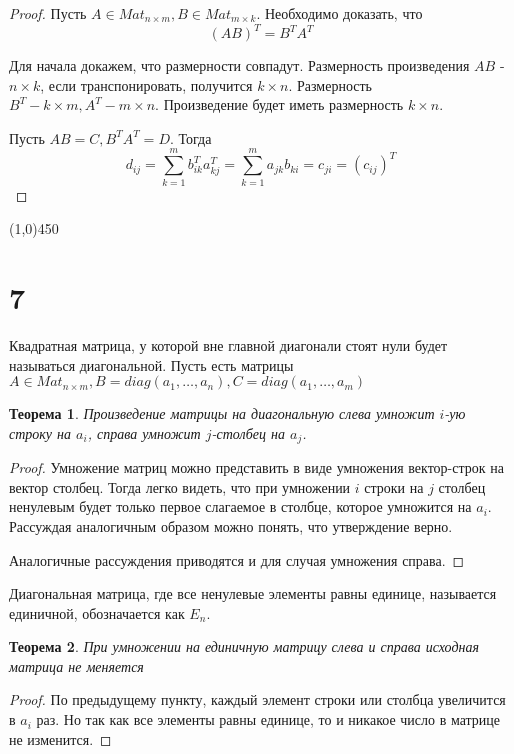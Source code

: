 \documentclass[a4paper,12pt]{article}
\newtheorem*{ther}{Теорема}
\begin{document}
	\begin{proof}
		Пусть $A \in Mat_{n \times m}, B \in Mat_{m \times k}$. Необходимо доказать, что 
		\[
		(AB)^T = B^TA^T
		\]
		
		Для начала докажем, что размерности совпадут. Размерность произведения $AB$ - $n \times k$, если транспонировать, получится $k \times n$. Размерность $B^T - k \times m, A^T - m \times n$. Произведение будет иметь размерность $k \times n$.	
		
		Пусть $AB = C, B^TA^T = D$. Тогда
		\[
		d_{ij} = \sum_{k = 1}^{m} b_{ik}^Ta_{kj}^T = \sum_{k = 1}^{m} a_{jk}b_{ki} = c_{ji} = (c_{ij})^T
		\]
	\end{proof}

	\begin{center}
		\line(1,0){450}
	\end{center}
	
	
	
	\section*{7}
	
	Квадратная матрица, у которой вне главной диагонали стоят нули будет называться диагональной.
	Пусть есть матрицы $A \in Mat_{n \times m}, B = diag(a_1, \ldots, a_n), C = diag(a_1, \ldots, a_m)$
	\begin{ther}
		Произведение матрицы на диагональную слева умножит $i$-ую строку на $a_i$, справа умножит $j$-столбец на $a_j$.
	\end{ther}
	
	\begin{proof}
		Умножение матриц можно представить в виде умножения вектор-строк на вектор столбец. Тогда легко видеть, что при умножении $i$ строки на $j$ столбец ненулевым будет только первое слагаемое в столбце, которое умножится на $a_i$. Рассуждая аналогичным образом можно понять, что утверждение верно.
		
		Аналогичные рассуждения приводятся и для случая умножения справа.
	\end{proof}
		
	Диагональная матрица, где все ненулевые элементы равны единице, называется единичной, обозначается как $E_n$.
	
	\begin{ther}
		При умножении на единичную матрицу слева и справа исходная матрица не меняется
	\end{ther}

	\begin{proof}
		По предыдущему пункту, каждый элемент строки или столбца увеличится в $a_i$ раз. Но так как все элементы равны единице, то и никакое число в матрице не изменится.
	\end{proof}
\end{document}
